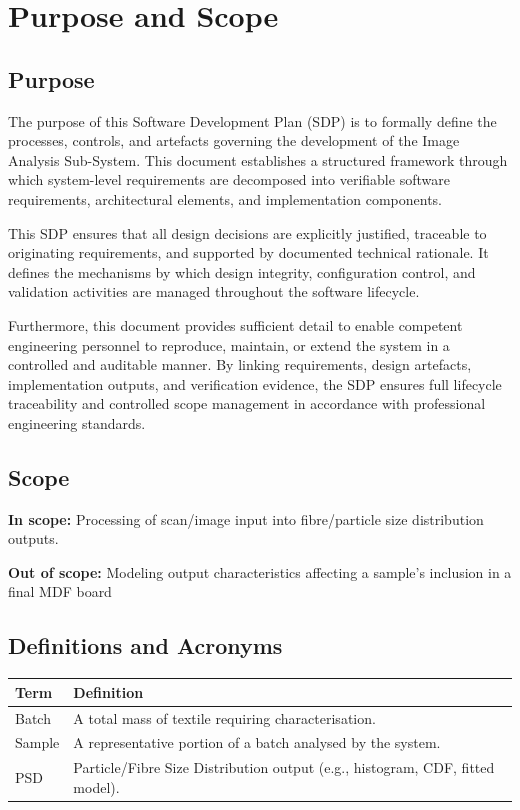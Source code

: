 \documentclass[11pt,a4paper]{article}
\newcommand{\subsystemName}{Image Analysis Sub-System}
\begin{document}
\section{Purpose and Scope}

\subsection{Purpose}
The purpose of this Software Development Plan (SDP) is to formally define the processes, controls, and artefacts governing the development of the \subsystemName. This document establishes a structured framework through which system-level requirements are decomposed into verifiable software requirements, architectural elements, and implementation components.

This SDP ensures that all design decisions are explicitly justified, traceable to originating requirements, and supported by documented technical rationale. It defines the mechanisms by which design integrity, configuration control, and validation activities are managed throughout the software lifecycle.

Furthermore, this document provides sufficient detail to enable competent engineering personnel to reproduce, maintain, or extend the system in a controlled and auditable manner. By linking requirements, design artefacts, implementation outputs, and verification evidence, the SDP ensures full lifecycle traceability and controlled scope management in accordance with professional engineering standards.

\subsection{Scope}

\textbf{In scope:}
Processing of scan/image input into fibre/particle size distribution outputs.

\textbf{Out of scope:}
Modeling output characteristics affecting a sample's inclusion in a final MDF board

\subsection{Definitions and Acronyms}
\begin{table}[H]
  \centering
  \renewcommand{\arraystretch}{1.2}
  \begin{tabularx}{\textwidth}{@{}lX@{}}
    \toprule
    \textbf{Term} & \textbf{Definition} \\
    \midrule
    Batch & A total mass of textile requiring characterisation. \\
    Sample & A representative portion of a batch analysed by the system. \\
    PSD & Particle/Fibre Size Distribution output (e.g., histogram, CDF, fitted model). \\
    \bottomrule
  \end{tabularx}
\end{table}
\end{document}
